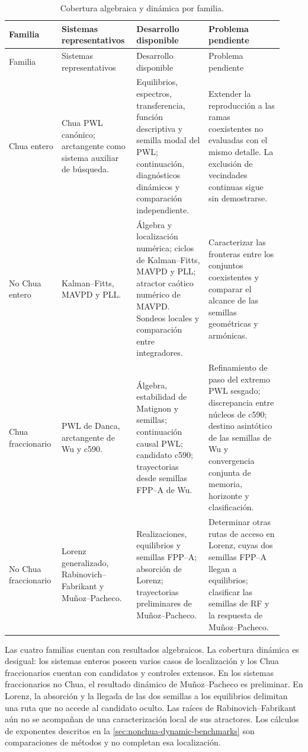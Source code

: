 \begin{longtable}{@{}L{0.16\linewidth}L{0.25\linewidth}L{0.25\linewidth}L{0.26\linewidth}@{}}
\caption{Cobertura algebraica y dinámica por familia.}
\label{tab:cobertura-cuatro-familias}\\
\toprule
Familia & Sistemas representativos & Desarrollo disponible & Problema pendiente\\
\midrule
\endfirsthead
\toprule
Familia & Sistemas representativos & Desarrollo disponible & Problema pendiente\\
\midrule
\endhead
Chua entero
& Chua PWL canónico; arctangente como sistema auxiliar de búsqueda.
& Equilibrios, espectros, transferencia, función descriptiva y semilla modal
del PWL; continuación, diagnósticos dinámicos y comparación independiente.
& Extender la reproducción a las ramas coexistentes no evaluadas con el
mismo detalle. La exclusión de vecindades continuas sigue sin demostrarse.\\
No Chua entero
& Kalman--Fitts, MAVPD y PLL.
& Álgebra y localización numérica; ciclos de Kalman--Fitts, MAVPD y PLL;
atractor caótico numérico de MAVPD. Sondeos locales y comparación entre integradores.
& Caracterizar las fronteras entre los conjuntos coexistentes y comparar el
alcance de las semillas geométricas y armónicas.\\
Chua fraccionario
& PWL de Danca, arctangente de Wu y c590.
& Álgebra, estabilidad de Matignon y semillas; continuación causal PWL;
candidato c590; trayectorias desde semillas FPP--A de Wu.
& Refinamiento de paso del extremo PWL sesgado; discrepancia entre núcleos de
c590; destino asintótico de las semillas de Wu y convergencia conjunta de
memoria, horizonte y clasificación.\\
No Chua fraccionario
& Lorenz generalizado, Rabinovich--Fabrikant y Muñoz--Pacheco.
& Realizaciones, equilibrios y semillas FPP--A; absorción de Lorenz;
trayectorias preliminares de Muñoz--Pacheco.
& Determinar otras rutas de acceso en Lorenz, cuyas dos semillas FPP--A llegan
a equilibrios; clasificar las semillas de RF y la respuesta de Muñoz--Pacheco.\\
\bottomrule
\end{longtable}

Las cuatro familias cuentan con resultados algebraicos. La cobertura dinámica
es desigual: los sistemas enteros poseen varios casos de localización y los
Chua fraccionarios cuentan con candidatos y controles extensos. En los
sistemas fraccionarios no Chua, el resultado dinámico de Muñoz--Pacheco es
preliminar. En Lorenz, la absorción y la llegada de las dos semillas a los
equilibrios delimitan una ruta que no accede al candidato oculto. Las raíces
de Rabinovich--Fabrikant aún no se acompañan de una caracterización local de
sus atractores. Los cálculos de exponentes descritos en la
\cref{sec:nonchua-dynamic-benchmarks} son comparaciones de métodos y no
completan esa localización.

